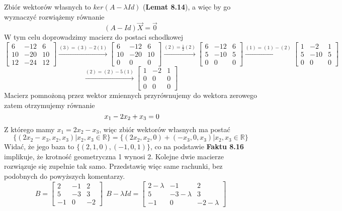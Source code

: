 \documentclass[12pt,a4paper]{article}
\begin{document}
Zbiór wektorów własnych to \(ker(A-\lambda Id)\) (\textbf{Lemat 8.14}), a więc by go wyznaczyć rozwiążemy równanie
\[
(A-Id)\vec{X}=\vec{0}
\]
W tym celu doprowadzimy macierz do postaci schodkowej
\[
\left[
\begin{array}{ccc}
6 & -12 & 6\\
10 & -20 & 10\\
12 & -24 & 12
\end{array}\right]
\xrightarrow{(3) = (3) - 2(1)}
\left[
\begin{array}{ccc}
6 & -12 & 6\\
10 & -20 & 10\\
0 & 0 & 0
\end{array}\right]
\xrightarrow{(2) = \frac{1}{2} (2)}
\left[
\begin{array}{ccc}
6 & -12 & 6\\
5 & -10 & 5\\
0 & 0 & 0
\end{array}\right]
\xrightarrow{(1)=(1)-(2)}
\left[
\begin{array}{ccc}
1 & -2 & 1\\
5 & -10 & 5\\
0 & 0 & 0
\end{array}\right]
\]
\[
\xrightarrow{(2)=(2)-5(1)}
\left[
\begin{array}{ccc}
1 & -2 & 1\\
0 & 0 & 0\\
0 & 0 & 0
\end{array}\right]
\]
Macierz pomnożoną przez wektor zmiennych przyrównujemy do wektora zerowego zatem otrzymujemy równanie
\[
\
x_1 - 2x_2 + x_3 = 0\\
\]
Z którego mamy \(x_1 = 2x_2-x_3\), więc zbiór wektorów własnych ma postać
\[
\{(2x_2-x_3,x_2,x_3)| x_2,x_3\in \mathbb{R}\}=
\{(2x_2,x_2,0)+(-x_3,0,x_3)| x_2,x_3\in \mathbb{R}\}
\]
Widać, że jego baza to \(\{(2,1,0),(-1,0,1)\}\), co na podstawie \textbf{Faktu 8.16} implikuje, że krotność geometryczna 1 wynosi 2.
\newpage
Kolejne dwie macierze rozwiązuje się zupełnie tak samo. Przedstawię więc same rachunki, bez podobnych do powyższych komentarzy.
\[
B=
\left[
\begin{array}{ccc}
2 & -1 & 2\\
5 & -3 & 3\\
-1 & 0 & -2
\end{array}\right]
~~B-\lambda Id=
\left[
\begin{array}{ccc}
2-\lambda & -1 & 2\\
5 & -3-\lambda & 3\\
-1 & 0 & -2-\lambda
\end{array}\right]
\]
\end{document}
